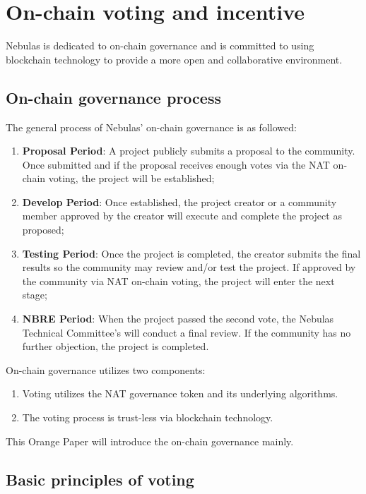 \section{On-chain voting and incentive}

Nebulas is dedicated to on-chain governance and is committed to using blockchain technology to provide a more open and collaborative environment.

\subsection{On-chain governance process}
\label{governance}

The general process of Nebulas' on-chain governance is as followed:

\begin{enumerate}
	\item \textbf{Proposal Period}: A project publicly submits a proposal to the community. Once submitted and if the proposal receives enough votes via the NAT on-chain voting, the project will be established;
	\item \textbf{Develop Period}: Once established, the project creator or a community member approved by the creator will execute and complete the project as proposed;
	\item \textbf{Testing Period}: Once the project is completed, the creator submits the final results so the community may review and/or test the project. If approved by the community via NAT on-chain voting, the project will enter the next stage;
	\item \textbf{NBRE Period}: When the project passed the second vote, the Nebulas Technical Committee's will conduct a final review. If the community has no further objection, the project is completed.
\end{enumerate}

On-chain governance utilizes two components:

\begin{enumerate}
	\item Voting utilizes the NAT governance token and its underlying algorithms.
	\item The voting process is trust-less via blockchain technology.
\end{enumerate}

This Orange Paper will introduce the on-chain governance mainly.

\subsection{Basic principles of voting}

